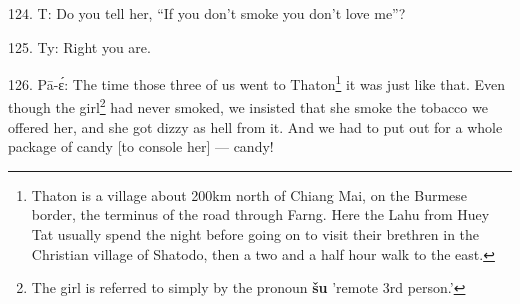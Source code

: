 124. T: Do you tell her, ``If you don't smoke you don't love me''?

125. Ty: Right you are.

126. Pā-ɛ́: The time those three of us went to Thaton\footnote{Thaton is a village about 200km north of Chiang Mai, on the Burmese border, the terminus of the road through Farng. Here the Lahu from Huey Tat usually spend the night before going on to visit their brethren in the Christian village of Shatodo, then a two and a half hour walk to the east.} it was just like that.
Even though the girl\footnote{The girl is referred to simply by the pronoun \textbf{šu} 'remote 3rd person.'} had never smoked, we insisted that she smoke the tobacco
we offered her, and she got dizzy as hell from it. And we had to put out for a
whole package of candy [to console her] --- candy!

